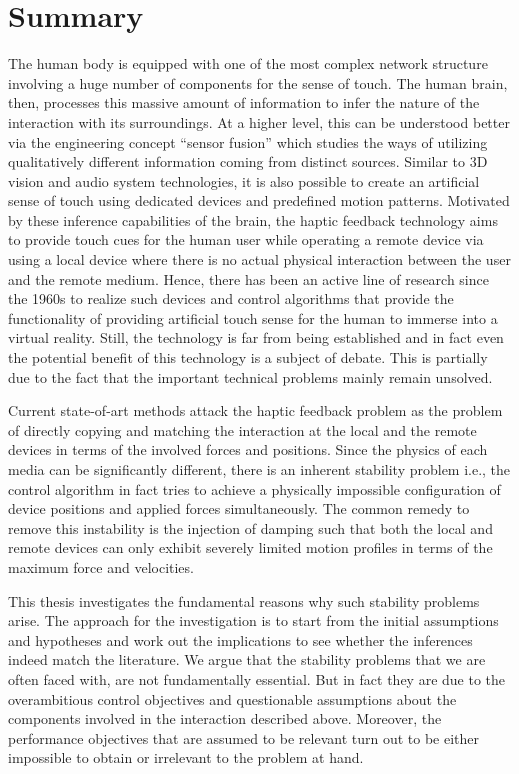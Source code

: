 \chapter{Summary}

The human body is equipped with one of the most complex network structure involving a huge number of components for the sense of touch. 
The human brain, then, processes this massive amount of information to infer the nature of the interaction with its surroundings. At a 
higher level, this can be understood better via the engineering concept \enquote{sensor fusion} which studies the ways of utilizing 
qualitatively different information coming from distinct sources. Similar to 3D vision and audio system technologies, it is also possible 
to create an artificial sense of touch using dedicated devices and predefined motion patterns. Motivated by these inference capabilities 
of the brain, the haptic feedback technology aims to provide touch cues for the human user while operating a remote device via using a 
local device where there is no actual physical interaction between the user and the remote medium. Hence, there has been an active line of 
research since the 1960s to realize such devices and control algorithms that provide the functionality of providing artificial touch sense 
for the human to immerse into a virtual reality. Still, the technology is far from being established and in fact even the potential benefit 
of this technology is a subject of debate. This is partially due to the fact that the important technical problems mainly remain unsolved. 

Current state-of-art methods attack the haptic feedback problem as the problem of directly copying and matching the interaction at the 
local and the remote devices in terms of the involved forces and positions. Since the physics of each media can be significantly 
different, there is an inherent stability problem i.e., the control algorithm in fact tries to achieve a physically impossible 
configuration of device positions and applied forces simultaneously. The common remedy to remove this instability is the injection of 
damping such that both the local and remote devices can only exhibit severely limited motion profiles in terms of the maximum force and 
velocities.

This thesis investigates the fundamental reasons why such stability problems arise. The approach for the investigation is to start from 
the initial assumptions and hypotheses and work out the implications to see whether the inferences indeed match the literature. We argue 
that the stability problems that we are often faced with, are not fundamentally essential. But in fact they are due to the overambitious 
control objectives and questionable assumptions about the components involved in the interaction described above. Moreover, the 
performance objectives that are assumed to be relevant turn out to be either impossible to obtain or irrelevant to the problem at hand. 

